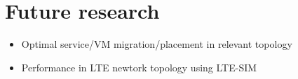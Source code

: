 \section{Future research}

\begin{itemize}
\item Optimal service/VM migration/placement in relevant topology
\item Performance in LTE newtork topology using LTE-SIM \cite{5634134}
\end{itemize}